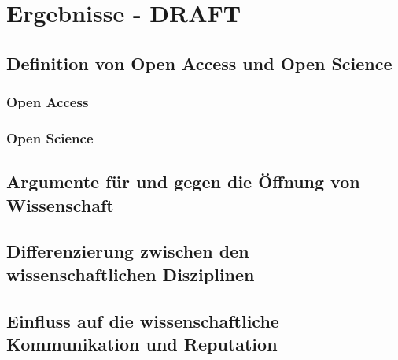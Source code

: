 \chapter{Ergebnisse - DRAFT}

\section{Definition von Open Access und Open Science}
\subsection{Open Access}
\subsection{Open Science}

\section{Argumente für und gegen die Öffnung von Wissenschaft}
\section{Differenzierung zwischen den wissenschaftlichen Disziplinen}
\section{Einfluss auf die wissenschaftliche Kommunikation und Reputation}